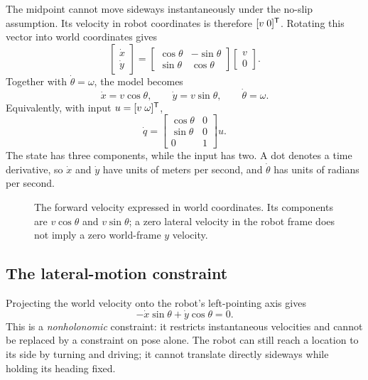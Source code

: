 The midpoint cannot move sideways instantaneously under the no-slip
assumption. Its velocity in robot coordinates is therefore $[v\;0]^{\mathsf T}$.
Rotating this vector into world coordinates gives
\begin{equation}
 \begin{bmatrix}\dot x\\\dot y\end{bmatrix}
 =\begin{bmatrix}\cos\theta&-\sin\theta\\
                  \sin\theta&\cos\theta\end{bmatrix}
  \begin{bmatrix}v\\0\end{bmatrix}.
\end{equation}
Together with $\dot\theta=\omega$, the model becomes
\begin{equation}
 \boxed{\dot x=v\cos\theta,\qquad
        \dot y=v\sin\theta,\qquad \dot\theta=\omega.}
 \label{eq:l09-unicycle}
\end{equation}
Equivalently, with input $u=[v\;\omega]^{\mathsf T}$,
\begin{equation}
 \dot q=
 \begin{bmatrix}\cos\theta&0\\\sin\theta&0\\0&1\end{bmatrix}u.
 \label{eq:l09-matrix}
\end{equation}
The state has three components, while the input has two. A dot denotes a
time derivative, so $\dot x$ and $\dot y$ have units of meters per second,
and $\dot\theta$ has units of radians per second.

\begin{figure}[htbp]
\centering
\caption{The forward velocity expressed in world coordinates. Its components
are $v\cos\theta$ and $v\sin\theta$; a zero lateral velocity in the robot
frame does not imply a zero world-frame $y$ velocity.}
\end{figure}

\subsection{The lateral-motion constraint}
Projecting the world velocity onto the robot's left-pointing axis gives
\begin{equation}
 -\dot x\sin\theta+\dot y\cos\theta=0.
 \label{eq:l09-constraint}
\end{equation}
This is a \emph{nonholonomic} constraint: it restricts instantaneous
velocities and cannot be replaced by a constraint on pose alone. The robot
can still reach a location to its side by turning and driving; it cannot
translate directly sideways while holding its heading fixed.

